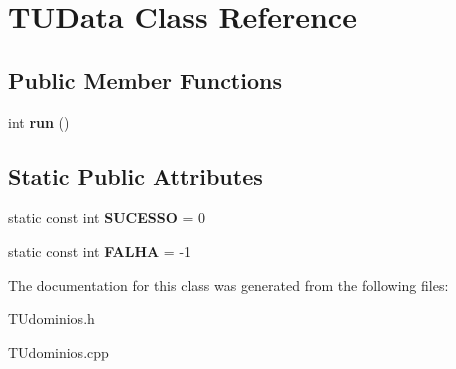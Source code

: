 \hypertarget{classTUData}{}\section{T\+U\+Data Class Reference}
\label{classTUData}
\subsection*{Public Member Functions}
\begin{DoxyCompactItemize}
\item 
\mbox{\label{classTUData_a4fd95b821fa6d55bdc82be6f3a3cbef2}} 
int {\bfseries run} ()
\end{DoxyCompactItemize}
\subsection*{Static Public Attributes}
\begin{DoxyCompactItemize}
\item 
\mbox{\label{classTUData_a59be2c38007b733030111a5aadfb4517}} 
static const int {\bfseries S\+U\+C\+E\+S\+SO} = 0
\item 
\mbox{\label{classTUData_a691cfac8c7fc4b3da149ef868de44f35}} 
static const int {\bfseries F\+A\+L\+HA} = -\/1
\end{DoxyCompactItemize}


The documentation for this class was generated from the following files\+:\begin{DoxyCompactItemize}
\item 
T\+Udominios.\+h\item 
T\+Udominios.\+cpp\end{DoxyCompactItemize}
